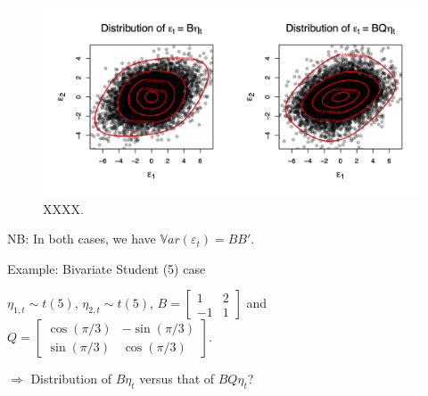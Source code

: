 \documentclass[
]{book}
\theoremstyle{definition}
\theoremstyle{definition}
\theoremstyle{definition}
\theoremstyle{definition}
\theoremstyle{remark}
\begin{document}
\begin{figure}
\includegraphics[width=0.95\linewidth]{images/Figure_C} \caption{XXXX.}\label{fig:preMadeFigureICAGaussianStudent}
\end{figure}

NB: In both cases, we have \(\mathbb{V}ar(\varepsilon_t)=BB'\).

Example: Bivariate Student (5) case

\(\eta_{1,t} \sim t(5)\), \(\eta_{2,t} \sim t(5)\),
\(B = \left[\begin{array}{cc} 1 & 2 \\ -1 & 1 \end{array}\right]\) and
\(Q = \left[\begin{array}{cc} \cos(\pi/3) & -\sin(\pi/3) \\ \sin(\pi/3) & \cos(\pi/3) \end{array}\right]\).

\(\Rightarrow\) Distribution of \(B \eta_t\) versus that of \(BQ\eta_t\)?
\end{document}
